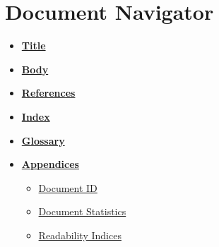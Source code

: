 \documentclass[table]{rapportCS}
\begin{document}
\section*{Document Navigator}
\begin{itemize}[label=$\bullet$]
  \item \textbf{\hyperref[sec:ourtribeone]{Title}} \hfill \textbf{ \pageref{sec:ourtribeone}}
  \item \textbf{\hyperref[sec:toc]{Body}} \hfill \textbf{ \pageref{sec:toc}}
  \item \textbf{\hyperref[sec:references]{References}} \hfill \textbf{ \pageref{sec:references}}
  \item \textbf{\hyperref[sec:myindex]{Index}} \hfill \textbf{ \pageref{sec:myindex}}
  \item \textbf{\hyperref[sec: glossary]{Glossary}} \hfill \textbf{ \pageref{sec: glossary}}
  \item \textbf{\hyperref[sec:appendix]{Appendices}} \hfill \textbf{ \pageref{sec:appendix}}
  \begin{itemize}[label=$\bullet$]
      \item \hyperref[tab:documentid]{Document ID}
      \hfill\textbf{ \pageref{tab:documentid}}
      \item \hyperref[tab:documentstats]{Document Statistics}
      \hfill\textbf{ \pageref{tab:documentstats}}
      \item \hyperref[tab:readability]{Readability Indices}
      \hfill\textbf{ \pageref{tab:readability}}
  \end{itemize}
\end{itemize}
\newpage





\end{document}
